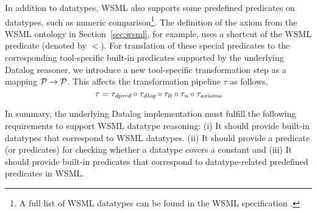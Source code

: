 In addition to datatypes, WSML also supports some predefined
predicates on datatypes, such as numeric comparison\footnote{A
full list of WSML datatypes can be found in the WSML specification
\cite{wsml-spec}.}. The definition of the axiom
 from the WSML
ontology in Section~\ref{sec:wsml}, for example, uses a shortcut
of the WSML  predicate (denoted by $<$). For
translation of these special predicates to the corresponding
tool-specific built-in predicates supported by the underlying
Datalog reasoner, we introduce a new tool-specific transformation
step \transdpred as a mapping $\P \rightarrow \P$. This affects
the transformation pipeline $\tau$ as follows. \compress
\begin{displaymath}
    \tau = \transdpred \circ \transdlog \circ \translt \circ \transnorm \circ
    \transax \compress
\end{displaymath}

In summary, the underlying Datalog implementation must fulfill the
following requirements to support WSML datatype reasoning: (i) It
should provide built-in datatypes that correspond to WSML
datatypes. (ii) It should provide a predicate (or predicates) for
checking whether a datatype covers a constant and (iii) It should
provide built-in predicates that correspond to datatype-related
predefined predicates in WSML.

